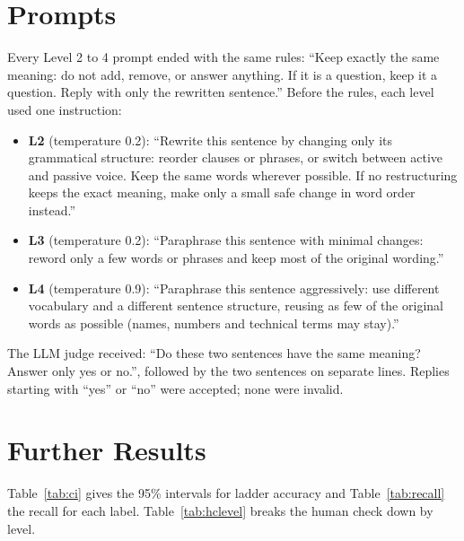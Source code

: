 \documentclass[11pt]{article}
\begin{document}



\appendix

\section{Prompts}
\label{app:prompts}
Every Level 2 to 4 prompt ended with the same rules: “Keep exactly the same meaning: do not add, remove, or answer anything. If it is a question, keep it a question. Reply with only the rewritten sentence.” Before the rules, each level used one instruction:
\begin{itemize}\setlength{\itemsep}{2pt}\setlength{\parskip}{0pt}
\item \textbf{L2} (temperature 0.2): “Rewrite this sentence by changing only its grammatical structure: reorder clauses or phrases, or switch between active and passive voice. Keep the same words wherever possible. If no restructuring keeps the exact meaning, make only a small safe change in word order instead.”
\item \textbf{L3} (temperature 0.2): “Paraphrase this sentence with minimal changes: reword only a few words or phrases and keep most of the original wording.”
\item \textbf{L4} (temperature 0.9): “Paraphrase this sentence aggressively: use different vocabulary and a different sentence structure, reusing as few of the original words as possible (names, numbers and technical terms may stay).”
\end{itemize}
The LLM judge received: “Do these two sentences have the same meaning? Answer only yes or no.”, followed by the two sentences on separate lines. Replies starting with “yes” or “no” were accepted; none were invalid.

\section{Further Results}
\label{app:tables}
Table~\ref{tab:ci} gives the 95\% intervals for ladder accuracy and Table~\ref{tab:recall} the recall for each label. Table~\ref{tab:hclevel} breaks the human check down by level.
\end{document}
